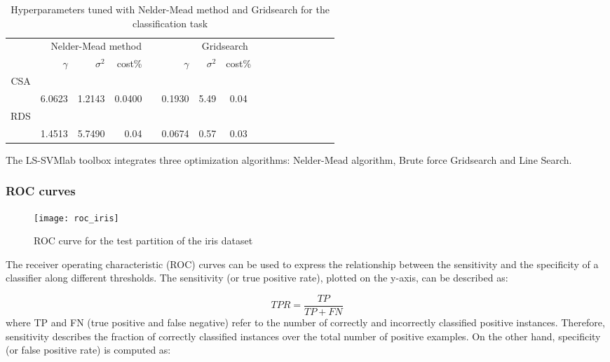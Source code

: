 \documentclass[conference,compsoc]{IEEEtran}
\begin{document}
 

\begin{table*}\centering
\begin{tabular}{@{}rrrrrrrccrrrcrrr@{}}\toprule
& \multicolumn{4}{c}{Nelder-Mead method} & \phantom{abc}& \multicolumn{2}{c}{Gridsearch} &
\phantom{abc} \\
\cmidrule{2-5} \cmidrule{7-9} \cmidrule{10-12}
& $\gamma$ & $\sigma^2$ &     cost\% &&  $\gamma$ & $\sigma^2$ &    cost\% \\ \midrule
CSA\\
 &  6.0623 & 1.2143 &  0.0400 && 0.1930 & 5.49 & 0.04 \\

RDS\\
 &   1.4513 & 5.7490& 0.04 &&  0.0674 & 0.57 &0.03 && \\



\bottomrule
\end{tabular}
\caption{Hyperparameters tuned with Nelder-Mead method and Gridsearch for the classification task}
       \label{fig:tune1}
\end{table*}




 The LS-SVMlab toolbox integrates three optimization algorithms: Nelder-Mead algorithm, Brute force Gridsearch and Line Search.



\subsubsection{ ROC curves}

\begin{figure}[]
			\centering
            \texttt{[image: roc\_iris]}
      
        \caption{ ROC curve for the test partition of the iris dataset }        
                   
        \label{fig:roc}
    \end{figure}


The receiver operating characteristic (ROC) curves can be used to express the relationship between the sensitivity and the specificity of a classifier along different thresholds. The sensitivity (or true positive rate), plotted on the y-axis, can be described as:

\begin{equation}
TPR = \frac{TP}{TP+FN}
\end{equation}
where TP and FN (true positive and false negative) refer to the number of correctly and incorrectly classified positive instances. Therefore, sensitivity describes the fraction of correctly classified instances over the total number of positive examples. On the other hand, specificity (or false positive rate) is computed as:
\end{document}
